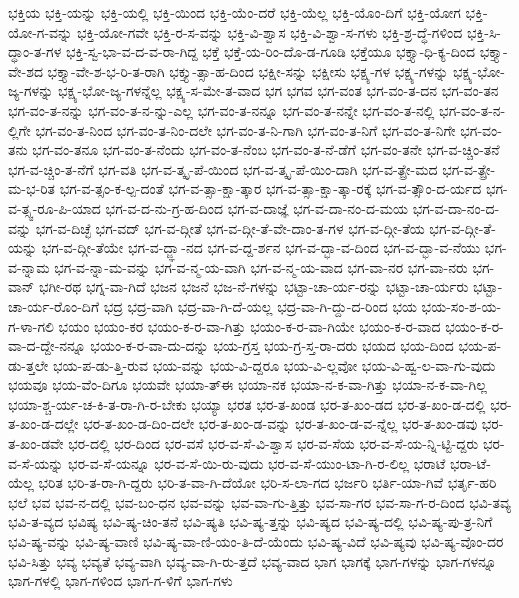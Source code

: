 {ಭಕ್ತಿಯ
ಭಕ್ತಿ-ಯನ್ನು
ಭಕ್ತಿ-ಯಲ್ಲಿ
ಭಕ್ತಿ-ಯಿಂದ
ಭಕ್ತಿ-ಯೆಂ-ದರೆ
ಭಕ್ತಿ-ಯೆಲ್ಲ
ಭಕ್ತಿ-ಯೊಂ-ದಿಗೆ
ಭಕ್ತಿ-ಯೋಗ
ಭಕ್ತಿ-ಯೋ-ಗ-ವನ್ನು
ಭಕ್ತಿ-ಯೋ-ಗವೇ
ಭಕ್ತಿ-ರ-ಸ-ವನ್ನು
ಭಕ್ತಿ-ವಿ-ಶ್ವಾಸ
ಭಕ್ತಿ-ವಿ-ಶ್ವಾ-ಸ-ಗಳು
ಭಕ್ತಿ-ಶ್ರ-ದ್ಧೆ-ಗಳಿಂದ
ಭಕ್ತಿ-ಸಿ-ದ್ಧಾಂ-ತ-ಗಳ
ಭಕ್ತಿ-ಸ್ವ-ಭಾ-ವ-ದ-ವ-ರಾ-ಗಿದ್ದ
ಭಕ್ತೆ
ಭಕ್ತೆ-ಯ-ರಿಂ-ದೊ-ಡ-ಗೂಡಿ
ಭಕ್ತೆಯೂ
ಭಕ್ತ್ಯಾ-ಧಿ-ಕ್ಯ-ದಿಂದ
ಭಕ್ತ್ಯಾ-ವೇ-ಶದ
ಭಕ್ತ್ಯಾ-ವೇ-ಶ-ಭ-ರಿ-ತ-ರಾಗಿ
ಭಕ್ತ್ಯು-ತ್ಸಾ-ಹ-ದಿಂದ
ಭಕ್ಷೀ-ಸನ್ನು
ಭಕ್ಷೀಸು
ಭಕ್ಷ್ಯ-ಗಳ
ಭಕ್ಷ್ಯ-ಗಳನ್ನು
ಭಕ್ಷ್ಯ-ಭೋ-ಜ್ಯ-ಗಳನ್ನು
ಭಕ್ಷ್ಯ-ಭೋ-ಜ್ಯ-ಗಳನ್ನೆಲ್ಲ
ಭಕ್ಷ್ಯ-ಸ-ಮೇ-ತ-ವಾದ
ಭಗ
ಭಗವ
ಭಗ-ವಂತ
ಭಗ-ವಂ-ತ-ದನ
ಭಗ-ವಂ-ತನ
ಭಗ-ವಂ-ತ-ನನ್ನು
ಭಗ-ವಂ-ತ-ನ-ನ್ನು-ಎಲ್ಲ
ಭಗ-ವಂ-ತ-ನನ್ನೂ
ಭಗ-ವಂ-ತ-ನನ್ನೇ
ಭಗ-ವಂ-ತ-ನಲ್ಲಿ
ಭಗ-ವಂ-ತ-ನ-ಲ್ಲಿಗೇ
ಭಗ-ವಂ-ತ-ನಿಂದ
ಭಗ-ವಂ-ತ-ನಿಂ-ದಲೇ
ಭಗ-ವಂ-ತ-ನಿ-ಗಾಗಿ
ಭಗ-ವಂ-ತ-ನಿಗೆ
ಭಗ-ವಂ-ತ-ನಿಗೇ
ಭಗ-ವಂ-ತನು
ಭಗ-ವಂ-ತನೂ
ಭಗ-ವಂ-ತ-ನೆಂದು
ಭಗ-ವಂ-ತ-ನೆಂಬ
ಭಗ-ವಂ-ತ-ನೆ-ಡೆಗೆ
ಭಗ-ವಂ-ತನೇ
ಭಗ-ವ-ಚ್ಚಿಂ-ತನೆ
ಭಗ-ವ-ಚ್ಚಿಂ-ತ-ನೆಗೆ
ಭಗ-ವತಿ
ಭಗ-ವ-ತ್ಕೃ-ಪೆ-ಯಿಂದ
ಭಗ-ವ-ತ್ಕೃ-ಪೆ-ಯಿಂ-ದಾಗಿ
ಭಗ-ವ-ತ್ಪ್ರೇ-ಮದ
ಭಗ-ವ-ತ್ಪ್ರೇ-ಮ-ಭ-ರಿತ
ಭಗ-ವ-ತ್ಸಂ-ಕ-ಲ್ಪ-ದಂತೆ
ಭಗ-ವ-ತ್ಸಾ-ಕ್ಷಾ-ತ್ಕಾರ
ಭಗ-ವ-ತ್ಸಾ-ಕ್ಷಾ-ತ್ಕಾ-ರಕ್ಕೆ
ಭಗ-ವ-ತ್ಸೌಂ-ದ-ರ್ಯದ
ಭಗ-ವ-ತ್ಸ್ವ-ರೂ-ಪಿ-ಯಾದ
ಭಗ-ವ-ದ-ನು-ಗ್ರ-ಹ-ದಿಂದ
ಭಗ-ವ-ದಾಜ್ಞೆ
ಭಗ-ವ-ದಾ-ನಂ-ದ-ಮಯ
ಭಗ-ವ-ದಾ-ನಂ-ದ-ವನ್ನು
ಭಗ-ವ-ದಿಚ್ಛೆ
ಭಗ-ವದ್
ಭಗ-ವ-ದ್ಗೀತೆ
ಭಗ-ವ-ದ್ಗೀ-ತೆ-ವೇ-ದಾಂ-ತ-ಗಳ
ಭಗ-ವ-ದ್ಗೀ-ತೆಯ
ಭಗ-ವ-ದ್ಗೀ-ತೆ-ಯನ್ನು
ಭಗ-ವ-ದ್ಗೀ-ತೆಯೇ
ಭಗ-ವ-ದ್ಜ್ಞಾ-ನದ
ಭಗ-ವ-ದ್ದ-ರ್ಶನ
ಭಗ-ವ-ದ್ಭಾ-ವ-ದಿಂದ
ಭಗ-ವ-ದ್ಭಾ-ವ-ನೆಯು
ಭಗ-ವ-ನ್ನಾಮ
ಭಗ-ವ-ನ್ನಾ-ಮ-ವನ್ನು
ಭಗ-ವ-ನ್ಮ-ಯ-ವಾಗಿ
ಭಗ-ವ-ನ್ಮ-ಯ-ವಾದ
ಭಗ-ವಾ-ನರ
ಭಗ-ವಾ-ನರು
ಭಗ-ವಾನ್
ಭಗೀ-ರಥ
ಭಗ್ನ-ವಾ-ಗಿದೆ
ಭಜನ
ಭಜನೆ
ಭಜ-ನೆ-ಗಳನ್ನು
ಭಟ್ಟಾ-ಚಾ-ರ್ಯ-ರನ್ನು
ಭಟ್ಟಾ-ಚಾ-ರ್ಯರು
ಭಟ್ಟಾ-ಚಾ-ರ್ಯ-ರೊಂ-ದಿಗೆ
ಭದ್ರ
ಭದ್ರ-ವಾಗಿ
ಭದ್ರ-ವಾ-ಗಿ-ದೆ-ಯಲ್ಲ
ಭದ್ರ-ವಾ-ಗಿ-ದ್ದು-ದ-ರಿಂದ
ಭಯ
ಭಯ-ಸಂ-ಶ-ಯ-ಗ-ಳಾ-ಗಲಿ
ಭಯಂ
ಭಯಂ-ಕರ
ಭಯಂ-ಕ-ರ-ವಾ-ಗಿತ್ತು
ಭಯಂ-ಕ-ರ-ವಾ-ಗಿಯೇ
ಭಯಂ-ಕ-ರ-ವಾದ
ಭಯಂ-ಕ-ರ-ವಾ-ದ-ದ್ದೇ-ನನ್ನೂ
ಭಯಂ-ಕ-ರ-ವಾ-ದು-ದನ್ನು
ಭಯ-ಗ್ರಸ್ತ
ಭಯ-ಗ್ರ-ಸ್ತ-ರಾ-ದರು
ಭಯದ
ಭಯ-ದಿಂದ
ಭಯ-ಪ-ಡು-ತ್ತಲೇ
ಭಯ-ಪ-ಡು-ತ್ತಿ-ರುವ
ಭಯ-ವನ್ನು
ಭಯ-ವಿ-ದ್ದರೂ
ಭಯ-ವಿ-ಲ್ಲವೋ
ಭಯ-ವಿ-ಹ್ವ-ಲ-ವಾ-ಗು-ವುದು
ಭಯವೂ
ಭಯ-ವೆಂ-ದಿಗೂ
ಭಯವೇ
ಭಯಾ-ತ್ಈ
ಭಯಾ-ನಕ
ಭಯಾ-ನ-ಕ-ವಾ-ಗಿತ್ತು
ಭಯಾ-ನ-ಕ-ವಾ-ಗಿಲ್ಲ
ಭಯಾ-ಶ್ಚ-ರ್ಯ-ಚ-ಕಿ-ತ-ರಾ-ಗಿ-ರ-ಬೇಕು
ಭಯ್ಯಾ
ಭರತ
ಭರ-ತ-ಖಂಡ
ಭರ-ತ-ಖಂ-ಡದ
ಭರ-ತ-ಖಂ-ಡ-ದಲ್ಲಿ
ಭರ-ತ-ಖಂ-ಡ-ದಲ್ಲೇ
ಭರ-ತ-ಖಂ-ಡ-ದಿಂ-ದಲೇ
ಭರ-ತ-ಖಂ-ಡ-ವನ್ನು
ಭರ-ತ-ಖಂ-ಡ-ವ-ನ್ನೆಲ್ಲ
ಭರ-ತ-ಖಂ-ಡವು
ಭರ-ತ-ಖಂ-ಡವೇ
ಭರ-ದಲ್ಲಿ
ಭರ-ದಿಂದ
ಭರ-ವಸೆ
ಭರ-ವ-ಸೆ-ವಿ-ಶ್ವಾಸ
ಭರ-ವ-ಸೆಯ
ಭರ-ವ-ಸೆ-ಯ-ನ್ನಿ-ಟ್ಟಿ-ದ್ದರು
ಭರ-ವ-ಸೆ-ಯನ್ನು
ಭರ-ವ-ಸೆ-ಯನ್ನೂ
ಭರ-ವ-ಸೆ-ಯಿ-ರು-ವುದು
ಭರ-ವ-ಸೆ-ಯುಂ-ಟಾ-ಗಿ-ರ-ಲಿಲ್ಲ
ಭರಾಟೆ
ಭರಾ-ಟೆ-ಯೆಲ್ಲ
ಭರಿತ
ಭರಿ-ತ-ರಾ-ಗಿ-ದ್ದರು
ಭರಿ-ತ-ವಾ-ಗಿ-ದೆಯೋ
ಭರಿ-ಸ-ಲಾ-ಗದ
ಭರ್ಜರಿ
ಭರ್ತಿ-ಯಾ-ಗಿವೆ
ಭರ್ತೃ-ಹರಿ
ಭಲೆ
ಭವ
ಭವ-ನ-ದಲ್ಲಿ
ಭವ-ಬಂ-ಧನ
ಭವ-ವನ್ನು
ಭವ-ವಾ-ಗು-ತ್ತಿತ್ತು
ಭವ-ಸಾ-ಗರ
ಭವ-ಸಾ-ಗ-ರ-ದಿಂದ
ಭವಿ-ತವ್ಯ
ಭವಿ-ತ-ವ್ಯದ
ಭವಿಷ್ಯ
ಭವಿ-ಷ್ಯ-ಚಿಂ-ತನೆ
ಭವಿ-ಷ್ಯತಿ
ಭವಿ-ಷ್ಯ-ತ್ತನ್ನು
ಭವಿ-ಷ್ಯದ
ಭವಿ-ಷ್ಯ-ದಲ್ಲಿ
ಭವಿ-ಷ್ಯ-ಪು-ತ್ರ-ನಿಗೆ
ಭವಿ-ಷ್ಯ-ವನ್ನು
ಭವಿ-ಷ್ಯ-ವಾಣಿ
ಭವಿ-ಷ್ಯ-ವಾ-ಣಿ-ಯಂ-ತಿ-ದೆ-ಯೆಂದು
ಭವಿ-ಷ್ಯ-ವಿದೆ
ಭವಿ-ಷ್ಯವು
ಭವಿ-ಷ್ಯ-ವೊಂ-ದರ
ಭವಿ-ಸಿತ್ತು
ಭವ್ಯ
ಭವ್ಯತೆ
ಭವ್ಯ-ವಾಗಿ
ಭವ್ಯ-ವಾ-ಗಿ-ರು-ತ್ತದೆ
ಭವ್ಯ-ವಾದ
ಭಾಗ
ಭಾಗಕ್ಕೆ
ಭಾಗ-ಗಳನ್ನು
ಭಾಗ-ಗಳನ್ನೂ
ಭಾಗ-ಗಳಲ್ಲಿ
ಭಾಗ-ಗಳಿಂದ
ಭಾಗ-ಗ-ಳಿಗೆ
ಭಾಗ-ಗಳು
}
